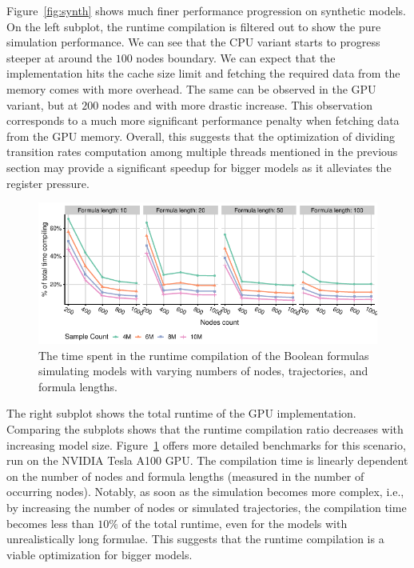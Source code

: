 \documentclass[times, twoside]{zHenriquesLab-StyleBioRxiv}
\begin{document}
Figure~\ref{fig:synth} shows much finer performance progression on synthetic models. On the left subplot, the runtime compilation is filtered out to show the pure simulation performance. We can see that the CPU variant starts to progress steeper at around the $100$ nodes boundary. We can expect that the implementation hits the cache size limit and fetching the required data from the memory comes with more overhead. The same can be observed in the GPU variant, but at $200$ nodes and with more drastic increase. This observation corresponds to a much more significant performance penalty when fetching data from the GPU memory. Overall, this suggests that the optimization of dividing transition rates computation among multiple threads mentioned in the previous section may provide a significant speedup for bigger models as it alleviates the register pressure.

\begin{figure}
    \centering
    \includegraphics[width=\linewidth]{Figures/nodes-compilation-big-NVIDIA Tesla A100 GPU.pdf}
    \caption{The time spent in the runtime compilation of the Boolean formulas simulating models with varying numbers of nodes, trajectories, and formula lengths.}
    \label{fig:comp}
\end{figure}

The right subplot shows the total runtime of the GPU implementation. Comparing the subplots shows that the runtime compilation ratio decreases with increasing model size. Figure~\ref{fig:comp} offers more detailed benchmarks for this scenario, run on the NVIDIA Tesla A100 GPU. The compilation time is linearly dependent on the number of nodes and formula lengths (measured in the number of occurring nodes). Notably, as soon as the simulation becomes more complex, i.e., by increasing the number of nodes or simulated trajectories, the compilation time becomes less than $10\%$ of the total runtime, even for the models with unrealistically long formulae. This suggests that the runtime compilation is a viable optimization for bigger models.
\end{document}

